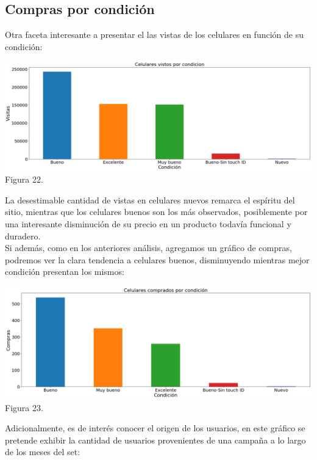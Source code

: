 \documentclass[a4paper ,12pt]{article}
\begin{document}
\subsection{Compras por condición}
Otra faceta interesante a presentar el las vistas de los celulares en función de su condición:
\begin{center}
	\includegraphics[width=1.1\linewidth]{output_72_1}
	Figura 22.
	
\end{center}

La desestimable cantidad de vistas en celulares nuevos remarca el espíritu del sitio, mientras que los celulares buenos son los más observados, posiblemente por una interesante disminución de su precio en un producto todavía funcional y duradero.\\


Si además, como en los anteriores análisis, agregamos un gráfico de compras, podremos ver la clara tendencia a celulares buenos, disminuyendo mientras mejor condición presentan los mismos:\\

\begin{center}
	\includegraphics[width=1.1\linewidth]{output_73_1}
	Figura 23.
	
\end{center}

Adicionalmente, es de interés conocer el origen de los usuarios, en este gráfico se pretende exhibir la cantidad de usuarios provenientes de una campaña a lo largo de los meses del set:\\
\end{document}
